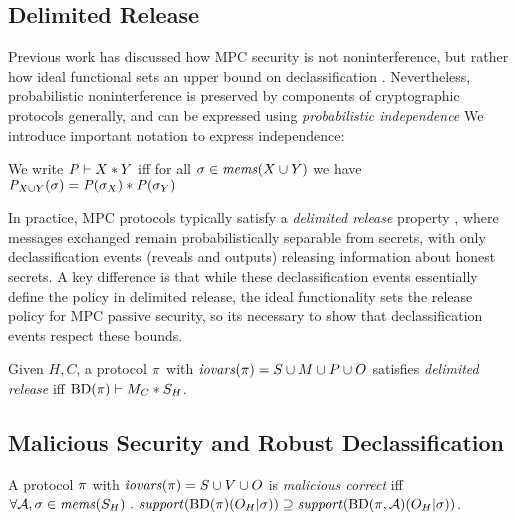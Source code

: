 \subsection{Delimited Release}

Previous work has discussed how MPC security is not noninterference,
but rather how ideal functional sets an upper bound on
declassification \cite{6266151,almeida2018enforcing}. Nevertheless,
probabilistic noninterference is preserved by components of
cryptographic protocols generally, and can be expressed using
\emph{probabilistic independence} \cite{darais2019language,barthe2019probabilistic}
We introduce important notation to express independence:
\begin{definition}
  We write $\mathit{P} \vdash X * Y$ iff for all
    $\sigma \in \mathit{mems}(X \cup Y)$ we have
  ${\mathit{P}}_{X \cup Y}(\sigma) =
  \mathit{P}(\sigma_X) * \mathit{P}(\sigma_Y)$
\end{definition}

In practice, MPC protocols typically satisfy a \emph{delimited release}
property \cite{sabelfeld2009declassification}, where messages exchanged remain probabilistically separable
from secrets, with only declassification events (reveals and outputs)
releasing information about honest secrets. A key difference is that while
these declassification events essentially define the policy in delimited
release, the ideal functionality sets the release policy for MPC
passive security, so its necessary to show that declassification events respect
these bounds.
\begin{definition}
  Given $H,C$, a protocol $\pi$ with $\mathit{iovars}(\pi) = S \cup M \cup P \cup O$
  satisfies \emph{delimited release} iff
  $\mathrm{BD}(\pi) \vdash M_C * S_H$.
\end{definition}

\subsection{Malicious Security and Robust Declassification}

\begin{definition}
  A protocol $\pi$ with $\mathit{iovars}(\pi) = S \cup V \cup O$ is \emph{malicious correct} iff
  $
  \forall \adversary, \store \in \mems(S_H) \ .\ \support(\progtt(\prog)(O_H|\store)) \supseteq
    \support(\progtt(\prog,\adversary)(O_H|\store))
  $.
\end{definition}

